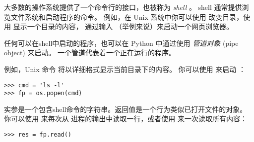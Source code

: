 {{{{{{{大多数的操作系统提供了一个命令行的接口，也被称为 {\em shell} 。
shell 通常提供浏览文件系统和启动程序的命令。
例如，在 Unix 系统中你可以使用  改变目录，使用  显示一个目录的内容，
通过输入  （举例来说）来启动一个网页浏览器。

  


任何可以在shell中启动的程序，也可以在 Python 中通过使用 {\em 管道对象} (pipe object) 来启动。 一个管道代表着一个正在运行的程序。


例如，Unix 命令  将以详细格式显示当前目录下的内容。
你可以使用  来启动  ：

  

\begin{lstlisting}
>>> cmd = 'ls -l'
>>> fp = os.popen(cmd)
\end{lstlisting}

%

实参是一个包含shell命令的字符串。返回值是一个行为类似已打开文件的对象。
你可以使用  来每次从  进程的输出中读取一行，或者使用  来一次读取所有内容：

  
  

\begin{lstlisting}
>>> res = fp.read()
\end{lstlisting}

%

}}}}}}}
